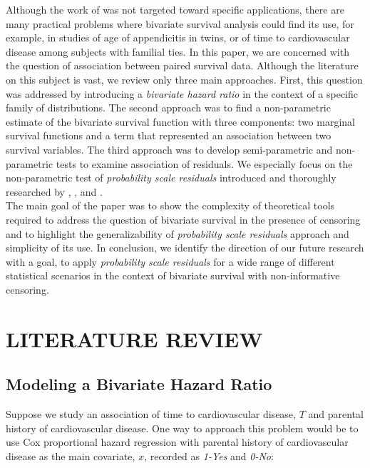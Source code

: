 \documentclass[]{article}
\begin{document}
Although the work of \cite{basu1971bivariate} was not targeted toward specific applications, there are many practical problems where bivariate survival analysis could find its use, for example, in studies of age of appendicitis in twins, or of time to cardiovascular disease among subjects with familial ties. In this paper, we are concerned with the question of association between paired survival data. Although the literature on this subject is vast, we review only three main approaches. First, this question was addressed by introducing a \emph{bivariate hazard ratio} in the context of a specific family of distributions. The second approach was to find a non-parametric estimate of the bivariate survival function with three components: two marginal survival functions and a term that represented an association between two survival variables. The third approach was to develop semi-parametric and non-parametric tests to examine association of residuals. We especially focus on the non-parametric test of \emph{probability scale residuals} introduced and thoroughly researched by \cite{li2012new}, \cite{lui2015covariate}, and \cite{shepherd2016probability}.\\
The main goal of the paper was to show the complexity of theoretical tools required to address the question of bivariate survival in the presence of censoring and to highlight the generalizability of \emph{probability scale residuals} approach and simplicity of its use. In conclusion, we identify the direction of our future research with a goal, to apply \emph{probability scale residuals} for a wide range of different statistical scenarios in the context of bivariate survival with non-informative censoring.

\section{LITERATURE REVIEW}

\subsection{Modeling a Bivariate Hazard Ratio}

Suppose we study an association of time to cardiovascular disease, $T$ and parental history of cardiovascular disease. One way to approach this problem would be to use Cox proportional hazard regression with parental history of cardiovascular disease as the main covariate, $x$, recorded as \emph{1-Yes} and \emph{0-No}:
\end{document}
